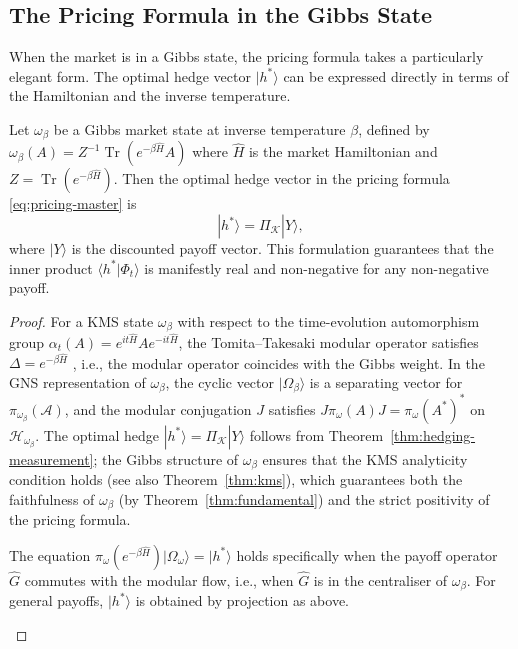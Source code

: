 \subsection{The Pricing Formula in the Gibbs State}

When the market is in a Gibbs state, the pricing formula takes a particularly
elegant form. The optimal hedge vector $|h^*\rangle$ can be expressed directly in
terms of the Hamiltonian and the inverse temperature.

\begin{proposition}\label{prop:gibbs-pricing}
Let $\omega_\beta$ be a Gibbs market state at inverse temperature $\beta$,
defined by $\omega_\beta(A) = Z^{-1}\operatorname{Tr}(e^{-\beta\hat{H}}A)$
where $\hat{H}$ is the market Hamiltonian and $Z = \operatorname{Tr}(e^{-\beta\hat{H}})$.
Then the optimal hedge vector in the pricing formula
\eqref{eq:pricing-master} is
\begin{equation*}
    |h^*\rangle = \Pi_{\mathcal{K}} |Y\rangle,
\end{equation*}
where $|Y\rangle$ is the discounted payoff vector. This formulation
guarantees that the inner product $\langle h^* | \Phi_t \rangle$ is
manifestly real and non-negative for any non-negative payoff.
\end{proposition}

\begin{proof}
For a KMS state $\omega_\beta$ with respect to the time-evolution
automorphism group $\alpha_t(A) = e^{it\hat{H}}Ae^{-it\hat{H}}$,
the Tomita--Takesaki modular operator satisfies $\Delta = e^{-\beta\hat{H}}$
\citep{bratteli1981operator}, i.e., the modular operator coincides with
the Gibbs weight. In the GNS representation of $\omega_\beta$, the cyclic
vector $|\Omega_\beta\rangle$ is a separating vector for
$\pi_{\omega_\beta}(\mathcal{A})$, and the modular conjugation $J$ satisfies
$J\pi_\omega(A)J = \pi_\omega(A^*)^*$ on $\mathcal{H}_{\omega_\beta}$.
The optimal hedge $|h^*\rangle = \Pi_{\mathcal{K}}|Y\rangle$ follows from
Theorem~\ref{thm:hedging-measurement}; the Gibbs structure of $\omega_\beta$
ensures that the KMS analyticity condition holds (see also
Theorem~\ref{thm:kms}), which guarantees both the faithfulness of
$\omega_\beta$ (by Theorem~\ref{thm:fundamental}) and the strict positivity
of the pricing formula.

\begin{remark}
The equation $\pi_\omega(e^{-\beta\hat{H}})|\Omega_\omega\rangle = |h^*\rangle$
holds specifically when the payoff operator $\hat{G}$ commutes with the
modular flow, i.e., when $\hat{G}$ is in the centraliser of $\omega_\beta$.
For general payoffs, $|h^*\rangle$ is obtained by projection as above.
\end{remark}
\end{proof}

